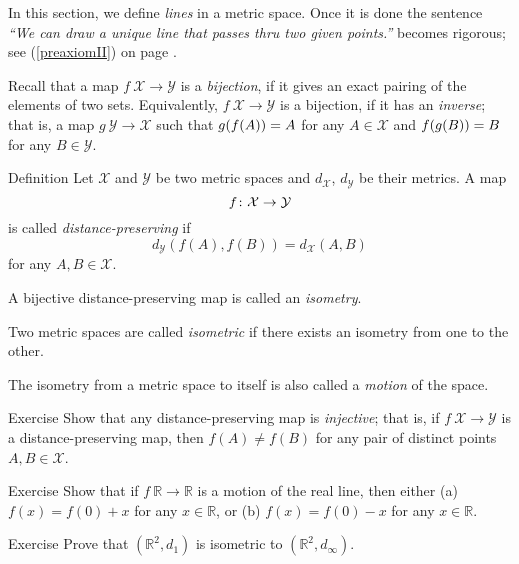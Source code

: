 In this section, we define {}\emph{lines} in a metric space.
Once it is done the sentence {}\emph{``We can draw a unique line that passes thru two given points.''} becomes rigorous; see (\ref{preaxiomII}) on page \pageref{preaxiomII}. 

Recall that a map $f\:\mathcal{X}\to\mathcal{Y}$
is a \emph{bijection},
if it gives an exact pairing of the elements of two sets.
Equivalently, $f\:\mathcal{X}\to\mathcal{Y}$ is a bijection, if it has an \emph{inverse};
that is, a map $g\:\mathcal{Y}\to\mathcal{X}$
such that 
$g(f(A))\z=A$ for any $A\in\mathcal{X}$
and
$f(g(B))\z=B$ for any $B\in\mathcal{Y}$. 

\begin{thm}{Definition}\label{def:isom}
Let $\mathcal X$ and $\mathcal Y$ be two metric spaces and $d_{\mathcal X}$, $d_{\mathcal Y}$ be their metrics. 
A map 
$$f\:\mathcal X \z\to \mathcal Y$$ 
is
called \emph{distance-preserving} if 
$$d_{\mathcal Y}(f(A), f(B))
 = d_{\mathcal X}(A,B)$$
for any $A,B\in {\mathcal X}$.

A bijective distance-preserving map is called an \emph{isometry}. 

Two metric spaces are called
\emph{isometric} if there exists an isometry from one to the other.

The isometry from a metric space to itself 
is also called a \emph{motion} of the space.
\end{thm}

\begin{thm}{Exercise}\label{ex:dist-preserv=>injective}
Show that any distance-preserving map is \emph{injective};
that is, if $f\:\mathcal X\to\mathcal Y$ is a distance-preserving map, 
then $f(A)\ne f(B)$ for any pair of distinct points $A, B\in \mathcal X$.
\end{thm}

\begin{thm}{Exercise}\label{ex:motion-of-R}
Show that if $f\:\mathbb{R}\to\mathbb{R}$ is a motion of the real line,
then either (a)
$f(x)=f(0)+x$ for any $x\in \mathbb{R}$, 
or (b)
$f(x)=f(0)-x$ for any $x\in \mathbb{R}$. 

\end{thm}

\begin{thm}{Exercise}\label{ex:d_1=d_infty}
Prove that $(\mathbb{R}^2,d_1)$ is isometric to $(\mathbb{R}^2,d_\infty)$.
\end{thm}


